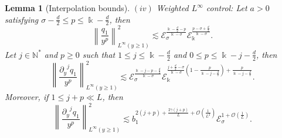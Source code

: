 \documentclass[11pt]{aims}
\newtheorem{lemma}[theorem]{Lemma}
\theoremstyle{definition}
\numberwithin{equation}{section}
\begin{document}
\begin{lemma}[Interpolation bounds]
\noindent $(iv)$ Weighted $L^\infty$ control: Let $a > 0$ satisfying $\sigma - \frac{d}{2} \leq p \leq \Bbbk -\frac{d}{2}$, then 
\begin{equation}\label{eq:boundLinfq}
\left\|\frac{q_1}{y^p}\right\|^2_{L^\infty(y \geq 1)} \lesssim {\mathscr{E}}_\sigma^{\frac{\Bbbk - \frac{d}{2} - p}{\Bbbk - \sigma}}{\mathscr{E}}_\Bbbk^{\frac{p - \sigma + \frac{d}{2}}{\Bbbk - \sigma}}.
\end{equation}
Let $j \in \mathbb{N}^*$ and $p \geq 0$ such that $1 \leq j \leq \Bbbk - \frac{d}{2}$ and $0 \leq p \leq \Bbbk - j - \frac{d}{2}$, then 
\begin{equation}\label{eq:boundLinfq2}
\left\|\frac{{\partial_y}^jq_1}{y^p}\right\|^2_{L^\infty(y \geq 1)} \lesssim {\mathscr{E}}_\sigma^{\frac{\Bbbk - j - p - \frac{d}{2}}{\Bbbk - \sigma}}{\mathscr{E}}_\Bbbk^{\frac{j + \frac{d}{2} -  \sigma}{\Bbbk - \sigma}\left(1 - \frac{p}{\Bbbk - j - \frac d2}\right) + \frac{p}{\Bbbk - j - \frac d2}}.
\end{equation}
Moreover, if $1\leq j + p \ll L$, then
\begin{equation}\label{eq:boundLinfq1}
\left\|\frac{{\partial_y}^j q_1}{y^p}\right\|^2_{L^\infty(y\geq 1)} \lesssim  b_1^{2(j + p) + \frac{2\gamma(j + p)}{L} + {\mathcal{O}}\left(\frac{1}{L^2}\right)}{\mathscr{E}}_\sigma^{1 + {\mathcal{O}}\left( \frac{1}{L}\right)}.
\end{equation}
\end{lemma}
\end{document}
